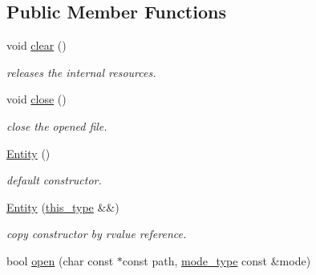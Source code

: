\subsection*{Public Member Functions}
\begin{DoxyCompactItemize}
\item 
\hypertarget{classhryky_1_1file_1_1descriptor_1_1_entity_ab82db665d6a00c8b8b503c18e3bd2759}{void \hyperlink{classhryky_1_1file_1_1descriptor_1_1_entity_ab82db665d6a00c8b8b503c18e3bd2759}{clear} ()}\label{classhryky_1_1file_1_1descriptor_1_1_entity_ab82db665d6a00c8b8b503c18e3bd2759}

\begin{DoxyCompactList}\small\item\em releases the internal resources. \end{DoxyCompactList}\item 
\hypertarget{classhryky_1_1file_1_1descriptor_1_1_entity_adc23c0b8b666862517c34174ed0b15b8}{void \hyperlink{classhryky_1_1file_1_1descriptor_1_1_entity_adc23c0b8b666862517c34174ed0b15b8}{close} ()}\label{classhryky_1_1file_1_1descriptor_1_1_entity_adc23c0b8b666862517c34174ed0b15b8}

\begin{DoxyCompactList}\small\item\em close the opened file. \end{DoxyCompactList}\item 
\hypertarget{classhryky_1_1file_1_1descriptor_1_1_entity_a43f0da5801f3de07cc722a59ce4f3207}{\hyperlink{classhryky_1_1file_1_1descriptor_1_1_entity_a43f0da5801f3de07cc722a59ce4f3207}{Entity} ()}\label{classhryky_1_1file_1_1descriptor_1_1_entity_a43f0da5801f3de07cc722a59ce4f3207}

\begin{DoxyCompactList}\small\item\em default constructor. \end{DoxyCompactList}\item 
\hypertarget{classhryky_1_1file_1_1descriptor_1_1_entity_aa29764109305c9753bf3c9347a03d3d7}{\hyperlink{classhryky_1_1file_1_1descriptor_1_1_entity_aa29764109305c9753bf3c9347a03d3d7}{Entity} (\hyperlink{classhryky_1_1file_1_1descriptor_1_1_entity_aeddd6b16ed286888bba1c419eee51d6c}{this\-\_\-type} \&\&)}\label{classhryky_1_1file_1_1descriptor_1_1_entity_aa29764109305c9753bf3c9347a03d3d7}

\begin{DoxyCompactList}\small\item\em copy constructor by rvalue reference. \end{DoxyCompactList}\item 
\hypertarget{classhryky_1_1file_1_1descriptor_1_1_entity_aa6790fdeb5d376b045278d439219850b}{bool \hyperlink{classhryky_1_1file_1_1descriptor_1_1_entity_aa6790fdeb5d376b045278d439219850b}{open} (char const $\ast$const path, \hyperlink{classhryky_1_1file_1_1descriptor_1_1_mode}{mode\-\_\-type} const \&mode)}\label{classhryky_1_1file_1_1descriptor_1_1_entity_aa6790fdeb5d376b045278d439219850b}


\end{DoxyCompactItemize}
